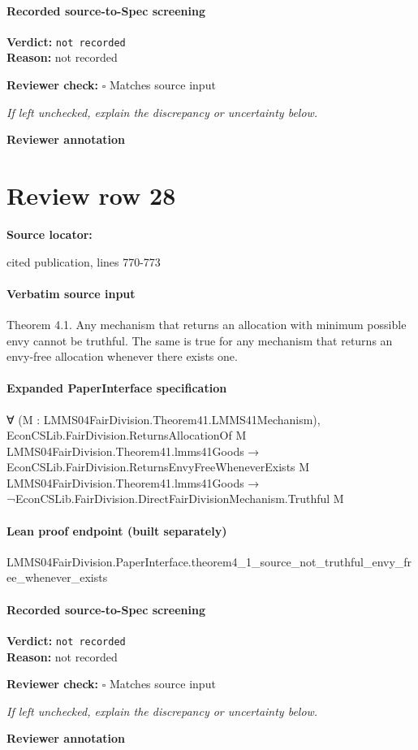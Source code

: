 \documentclass[10pt]{article}
\newcommand{\reviewerbox}{%
  \par\noindent\fbox{\parbox{0.96\linewidth}{\rule{0pt}{0.38in}}}\par
}
\newcommand{\reviewmatch}[1]{%
  \par\noindent\textbf{Reviewer check:} $\square$\; #1\par
  \noindent\emph{If left unchecked, explain the discrepancy or uncertainty below.}\par
}
\begin{document}
\paragraph{Recorded source-to-Spec screening}
\textbf{Verdict:} \texttt{not recorded}
\\
\textbf{Reason:} not recorded
\reviewmatch{Matches source input}
\noindent\textbf{Reviewer annotation}\par
\reviewerbox
\clearpage
\hypertarget{source-claim-87600c3a3d619cbf}{}
\section*{Review row 28}
\textbf{Source locator:} {\footnotesize\raggedright cited publication, lines 770-\allowbreak{}773\par}
\paragraph{Verbatim source input}
\begin{ReviewVerbatim}
Theorem 4.1. Any mechanism that returns an allocation
with minimum possible envy cannot be truthful. The same is
true for any mechanism that returns an envy-free allocation
whenever there exists one.
\end{ReviewVerbatim}


\paragraph{Expanded PaperInterface specification}
\begin{ReviewVerbatim}
∀ (M : LMMS04FairDivision.Theorem41.LMMS41Mechanism),
  EconCSLib.FairDivision.ReturnsAllocationOf M LMMS04FairDivision.Theorem41.lmms41Goods →
    EconCSLib.FairDivision.ReturnsEnvyFreeWheneverExists M LMMS04FairDivision.Theorem41.lmms41Goods →
      ¬EconCSLib.FairDivision.DirectFairDivisionMechanism.Truthful M
\end{ReviewVerbatim}

\paragraph{Lean proof endpoint (built separately)}\begin{ReviewVerbatim}
LMMS04FairDivision.PaperInterface.theorem4_1_source_not_truthful_envy_free_whenever_exists
\end{ReviewVerbatim}

\paragraph{Recorded source-to-Spec screening}
\textbf{Verdict:} \texttt{not recorded}
\\
\textbf{Reason:} not recorded
\reviewmatch{Matches source input}
\noindent\textbf{Reviewer annotation}\par
\reviewerbox
\clearpage
\hypertarget{source-claim-b1ad798761a4903c}{}
\end{document}
